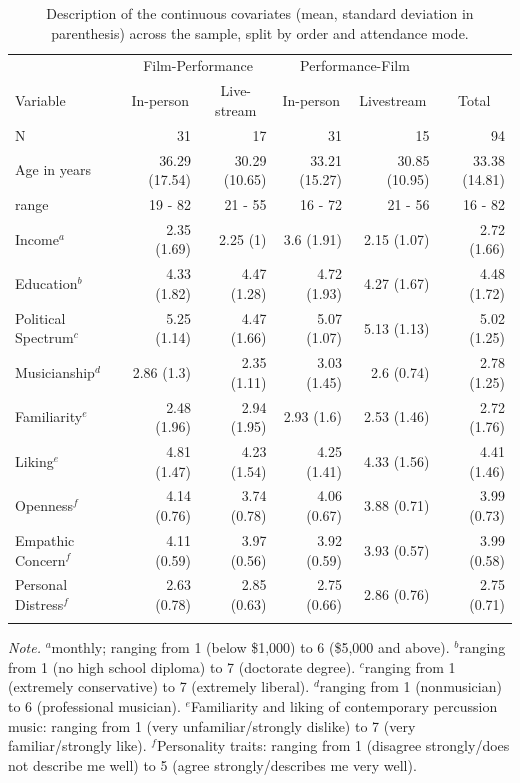\documentclass[
  man,floatsintext]{apa6}
\begin{document}
\begin{table}[tbp]

\begin{center}
\begin{threeparttable}

\caption{\label{tab:cont-sample-description}Description of the continuous covariates (mean, standard deviation in parenthesis) across the sample, split by order and attendance mode.}

\begin{tabular}{lrrrrr}
\toprule
 & \multicolumn{2}{c}{Film-Performance} & \multicolumn{2}{c}{Performance-Film}  &\\
\cmidrule(r){2-3} \cmidrule(r){4-5}
Variable & \multicolumn{1}{c}{In-person} & \multicolumn{1}{c}{Live-stream} & \multicolumn{1}{c}{In-person} & \multicolumn{1}{c}{Livestream} & \multicolumn{1}{c}{Total}\\
\midrule
N & 31 & 17 & 31 & 15 & 94\\
Age in years & 36.29 (17.54) & 30.29 (10.65) & 33.21 (15.27) & 30.85 (10.95) & 33.38 (14.81)\\
range & 19 - 82 & 21 - 55 & 16 - 72 & 21 - 56 & 16 - 82\\
Income$^a$ & 2.35 (1.69) & 2.25 (1) & 3.6 (1.91) & 2.15 (1.07) & 2.72 (1.66)\\
Education$^b$ & 4.33 (1.82) & 4.47 (1.28) & 4.72 (1.93) & 4.27 (1.67) & 4.48 (1.72)\\
Political Spectrum$^c$ & 5.25 (1.14) & 4.47 (1.66) & 5.07 (1.07) & 5.13 (1.13) & 5.02 (1.25)\\
Musicianship$^d$ & 2.86 (1.3) & 2.35 (1.11) & 3.03 (1.45) & 2.6 (0.74) & 2.78 (1.25)\\
Familiarity$^e$ & 2.48 (1.96) & 2.94 (1.95) & 2.93 (1.6) & 2.53 (1.46) & 2.72 (1.76)\\
Liking$^e$ & 4.81 (1.47) & 4.23 (1.54) & 4.25 (1.41) & 4.33 (1.56) & 4.41 (1.46)\\
Openness$^f$ & 4.14 (0.76) & 3.74 (0.78) & 4.06 (0.67) & 3.88 (0.71) & 3.99 (0.73)\\
Empathic Concern$^f$ & 4.11 (0.59) & 3.97 (0.56) & 3.92 (0.59) & 3.93 (0.57) & 3.99 (0.58)\\
Personal Distress$^f$ & 2.63 (0.78) & 2.85 (0.63) & 2.75 (0.66) & 2.86 (0.76) & 2.75 (0.71)\\
\bottomrule
\addlinespace
\end{tabular}

\begin{tablenotes}[para]
\normalsize{\textit{Note.} $^a$monthly; ranging from 1 (below \$1,000) to 6 (\$5,000 and above). $^b$ranging from 1 (no high school diploma) to 7 (doctorate degree). $^c$ranging from 1 (extremely conservative) to 7 (extremely liberal). $^d$ranging from 1 (nonmusician) to 6 (professional musician). $^e$Familiarity and liking of contemporary percussion music: ranging from 1 (very unfamiliar/strongly dislike) to 7 (very familiar/strongly like). $^f$Personality traits: ranging from 1 (disagree strongly/does not describe me well) to 5 (agree strongly/describes me very well).}
\end{tablenotes}


\end{threeparttable}
\end{center}
\end{table}
\end{document}
